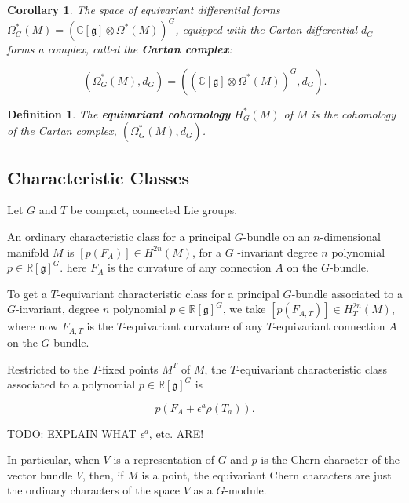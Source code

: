 \documentclass{article}
\newtheorem{corollary}[theorem]{Corollary}
\newtheorem{defn}[theorem]{Definition\rm}
\newcommand{\W}{\Omega}
\newcommand{\e}{\epsilon}
\newcommand{\RR}{\mathbb{R}}
\newcommand{\CC}{\mathbb{C}}
\newcommand{\mfg}{\mathfrak{g}}
\begin{document}
\begin{corollary}
	The space of equivariant differential forms $\W_{G}^{\ast}(M) = \left( \CC[\mfg] \otimes \W^{\ast}(M) \right)^{G}$, equipped with the Cartan differential $d_{G}$ forms a complex, called the \textbf{Cartan complex}:
	
	\begin{equation*}
		\left( \W_{G}^{\ast}(M), d_{G} \right) = \left( (\CC[\mfg] \otimes \W^{\ast}(M)   )^{G}, d_{G} \right).
	\end{equation*}

\end{corollary}

\begin{defn}
	The \textbf{equivariant cohomology} $H_{G}^{\ast}(M)$ of $M$ is the cohomology of the Cartan complex, $(\W_{G}^{\ast}(M), d_{G})$.
\end{defn}

\subsection{Characteristic Classes}

Let $G$ and $T$ be compact, connected Lie groups.

An ordinary characteristic class for a principal $G$-bundle on an $n$-dimensional manifold $M$ is $[p(F_{A})] \in H^{2n}(M)$, for a $G$ -invariant degree $n$ polynomial $p \in \RR[\mfg]^{G}$. here $F_{A}$ is the curvature of any connection $A$ on the $G$-bundle.

To get a $T$-equivariant characteristic class for a principal $G$-bundle associated to a $G$-invariant, degree $n$ polynomial $p \in \RR[\mfg]^{G}$, we take $[p(F_{A, T})] \in H_{T}^{2n}(M)$, where now $F_{A,T}$ is the $T$-equivariant curvature of any $T$-equivariant connection $A$ on the $G$-bundle.

Restricted to the $T$-fixed points $M^{T}$ of $M$, the $T$-equivariant characteristic class associated to a polynomial $p \in \RR[\mfg]^{G}$ is

\begin{equation*}
	p(F_{A} + \e^{a}\rho(T_{a})).
\end{equation*}

TODO: EXPLAIN WHAT $\e^{a}$, etc. ARE!

In particular, when $V$ is a representation of $G$ and $p$ is the Chern character of the vector bundle $V$, then, if $M$ is a point, the equivariant Chern characters are just the ordinary characters of the space $V$ as a $G$-module.
\end{document}

